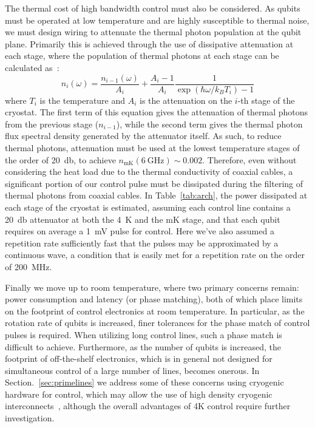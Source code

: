 The thermal cost of high bandwidth control must also be considered. As qubits must be operated at low
temperature and are highly susceptible to thermal noise, we must design wiring to attenuate the thermal photon population at the qubit plane. Primarily this is achieved
through the use of dissipative attenuation at each stage, where the population of thermal photons at each stage can be calculated as~\cite{Krinner2019}:
\begin{equation}
  n_i(\omega) = \frac{n_{i-1}(\omega)}{A_i} + \frac{A_i - 1}{A_i}\frac{1}{\exp(\hbar\omega/k_BT_i) - 1}
  \label{eq:phot}
\end{equation}
where $T_i$ is the temperature and $A_i$ is the attenuation on the $i$-th stage of the cryostat. The first term of this equation gives the attenuation of thermal photons
from the previous stage ($n_{i-1}$), while the second term gives the thermal photon flux spectral density generated by the attenuator itself. As such, to reduce thermal photons,
attenuation must be used at the lowest temperature stages of the order of \SI{20}{\decibel}, to achieve $n_\textrm{mK}(\SI{6}{\giga\hertz}) \sim 0.002$. Therefore,
even without considering the heat load due to the thermal conductivity of coaxial cables, a significant portion of our control pulse must be dissipated during the
filtering of thermal photons from coaxial cables. In Table~\ref{tab:arch}, the power dissipated at each stage of the cryostat is estimated, assuming each control line contains
a \SI{20}{\decibel} attenuator at both the \SI{4}{\kelvin} and the mK stage, and that each qubit requires on average a \SI{1}{\milli\volt} pulse for control. Here we've also
assumed a repetition rate sufficiently fast that the pulses may be approximated by a continuous wave, a condition that is easily met for a repetition rate on the order of
\SI{200}{\mega\hertz}.

Finally we move up to room temperature, where two primary concerns remain: power consumption and latency (or phase matching), both of which place limits on the footprint
of control electronics at room temperature. In particular, as the rotation rate of qubits is increased, finer tolerances for the phase match of control pulses
is required. When utilizing long control lines, such a phase match is difficult to achieve. Furthermore, as the number of qubits is increased, the footprint of
off-the-shelf electronics, which is in general not designed for simultaneous control of a large number of lines, becomes onerous. In Section.~\ref{sec:primelines}
we address some of these concerns using cryogenic hardware for control, which may allow the use of high density cryogenic interconnects~\cite{Tuckerman_2016}, although
the overall advantages of 4K control require further investigation.

